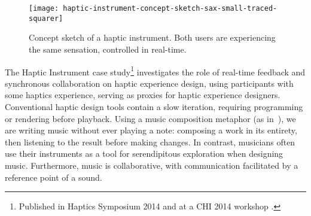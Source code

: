 \begin{figure}[h] %
   \centering
   \texttt{[image: haptic-instrument-concept-sketch-sax-small-traced-squarer]} 
   \caption{Concept sketch of a haptic instrument. Both users are experiencing the same sensation, controlled in real-time.}
   \label{fig:HapticInstrumentConceptSketch}
\end{figure}

The Haptic Instrument case study\footnote{Published in Haptics Symposium 2014 \cite{Schneider2014} and at a CHI 2014 workshop \cite{Schneider2014b}.} investigates the role of real-time feedback and synchronous collaboration on haptic experience design, using participants with some haptics experience, serving as proxies for haptic experience designers.
Conventional haptic design tools contain a slow iteration, requiring programming or rendering before playback.
Using a music composition metaphor (as in~\cite{Lee2009}), we are writing music without ever playing a note: composing a work in its entirety, then listening to the result before making changes.
In contrast, musicians often use their instruments as a tool for serendipitous exploration when designing music.
Furthermore, music is collaborative, with communication facilitated by a reference point of a sound.








